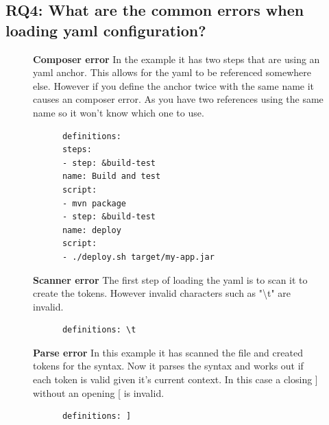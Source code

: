 \documentclass[twoside,12pt,titlepage,a4paper]{article}
\begin{document}

\vspace*{-0.05in}
\subsection{\textbf{RQ4}: What are the common errors when loading yaml configuration?}
\label{section:RQ4}
\vspace*{-0.05in}

\begin{figure}[!ht]
  \centering
  \begin{minipage}[t]{.48\textwidth}
    \textbf{Composer error}
    In the example it has two steps that are using an yaml anchor. This allows for the yaml to be referenced somewhere else. However if you define the anchor twice with the same name it causes an composer error. As you have two references using the same name so it won't know which one to use.
  \end{minipage}%
  \hfill
  \begin{minipage}[t]{.48\textwidth}
    \begin{verbatim}
      definitions: 
      steps:
      - step: &build-test
      name: Build and test
      script:
      - mvn package
      - step: &build-test
      name: deploy
      script:
      - ./deploy.sh target/my-app.jar
    \end{verbatim}
  \end{minipage}
\end{figure}

\begin{figure}[!h]
  \centering
  \begin{minipage}[t]{.48\textwidth}
    \textbf{Scanner error}
    The first step of loading the yaml is to scan it to create the tokens. However invalid characters such as "\textbackslash t" are invalid. 
  \end{minipage}%
  \hfill
  \begin{minipage}[t]{.48\textwidth}
    \begin{verbatim}
      definitions: \t
    \end{verbatim}
  \end{minipage}
\end{figure}
\begin{figure}[!ht]
  \centering
  \begin{minipage}[t]{.48\textwidth}
    \textbf{Parse error}
    In this example it has scanned the file and created tokens for the syntax. Now it parses the syntax and works out if each token is valid given it's current context. In this case a closing ] without an opening [ is invalid.
  \end{minipage}%
  \hfill
  \begin{minipage}[t]{.48\textwidth}
    \begin{verbatim}
      definitions: ]
    \end{verbatim}
  \end{minipage}
\end{figure}
\end{document}
